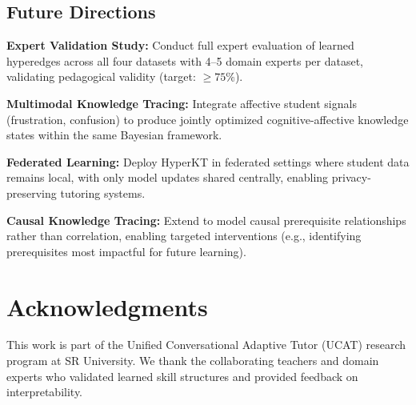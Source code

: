\documentclass[10pt,twocolumn]{article}
\begin{document}
\subsection{Future Directions}

\textbf{Expert Validation Study:} Conduct full expert evaluation of learned hyperedges across all four datasets with 4--5 domain experts per dataset, validating pedagogical validity (target: $\geq 75\%$).

\textbf{Multimodal Knowledge Tracing:} Integrate affective student signals (frustration, confusion) to produce jointly optimized cognitive-affective knowledge states within the same Bayesian framework.

\textbf{Federated Learning:} Deploy HyperKT in federated settings where student data remains local, with only model updates shared centrally, enabling privacy-preserving tutoring systems.

\textbf{Causal Knowledge Tracing:} Extend to model causal prerequisite relationships rather than correlation, enabling targeted interventions (e.g., identifying prerequisites most impactful for future learning).

\section*{Acknowledgments}

This work is part of the Unified Conversational Adaptive Tutor (UCAT) research program at SR University. We thank the collaborating teachers and domain experts who validated learned skill structures and provided feedback on interpretability.
\end{document}
